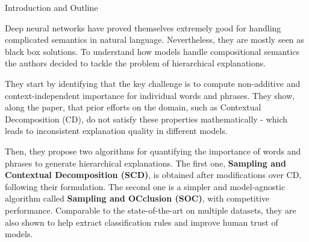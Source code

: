 \documentclass[final]{beamer}
\newlength{\onecolwid}
\begin{document}
\begin{frame}[t]
\begin{columns}[t]
\begin{column}{\onecolwid}
\begin{block}{Introduction and Outline}





Deep neural networks have proved themselves extremely good for handling complicated semantics in natural language. Nevertheless, they are mostly seen as black box solutions. To understand how models handle compositional semantics the authors decided to tackle the problem of hierarchical explanations. 

They start by identifying that the key challenge is to compute non-additive and context-independent importance for individual words and phrases. They show, along the paper, that prior efforts on the domain, such as Contextual Decomposition (CD), do not satisfy these properties mathematically - which leads to inconsistent explanation quality in different models.   

Then, they propose two algorithms for quantifying the importance of words and phrases to generate hierarchical explanations. The first one, \textbf{Sampling and Contextual Decomposition (SCD)}, is obtained after modifications over CD, following their formulation. The second one is a simpler and model-agnostic algorithm called \textbf{Sampling and OCclusion (SOC)}, with competitive performance. Comparable to the state-of-the-art on multiple datasets, they are also shown to help extract classification rules and improve human trust of models.


\end{block}
\end{column}
\end{columns}
\end{frame}
\end{document}

